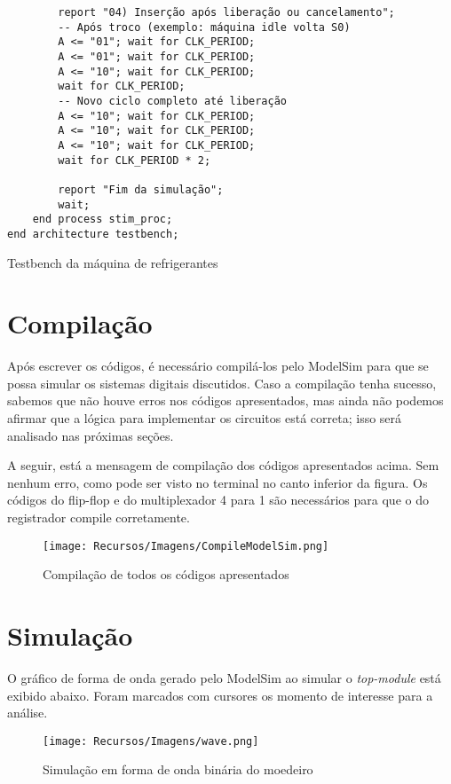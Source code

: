 \documentclass[a4paper,12pt]{article}
\newenvironment{code}{\captionsetup{type=listing}}{}
\begin{document}
\begin{code}
\begin{verbatim}
        report "04) Inserção após liberação ou cancelamento";
        -- Após troco (exemplo: máquina idle volta S0)
        A <= "01"; wait for CLK_PERIOD;
        A <= "01"; wait for CLK_PERIOD;
        A <= "10"; wait for CLK_PERIOD;
        wait for CLK_PERIOD;
        -- Novo ciclo completo até liberação
        A <= "10"; wait for CLK_PERIOD;
        A <= "10"; wait for CLK_PERIOD;
        A <= "10"; wait for CLK_PERIOD;
        wait for CLK_PERIOD * 2;

        report "Fim da simulação";
        wait;
    end process stim_proc;
end architecture testbench;
    \end{verbatim}
    \caption{Testbench da máquina de refrigerantes}
\end{code}


\section{Compilação}
Após escrever os códigos, é necessário compilá-los pelo ModelSim para que se possa simular os sistemas digitais discutidos. Caso a compilação tenha sucesso, sabemos que não houve erros nos códigos apresentados, mas ainda não podemos afirmar que a lógica para implementar os circuitos está correta; isso será analisado nas próximas seções.

A seguir, está a mensagem de compilação dos códigos apresentados acima. Sem nenhum erro, como pode ser visto no terminal no canto inferior da figura. Os códigos do flip-flop e do multiplexador 4 para 1 são necessários para que o do registrador compile corretamente.

\begin{figure}[H]
    \centering
    \texttt{[image: Recursos/Imagens/CompileModelSim.png]}
    \caption{Compilação de todos os códigos apresentados}
\end{figure}

\newpage

\section{Simulação}
O gráfico de forma de onda gerado pelo ModelSim ao simular o \textit{top-module} está exibido abaixo. Foram marcados com cursores os momento de interesse para a análise.

\begin{figure}[H]
    \centering
    \begin{tcolorbox}[colframe=cinza, colback=white, boxrule=0.75pt, arc=0pt, width=1\textwidth, center, boxsep=0pt, left=0pt, right=0pt, top=0pt, bottom=0pt]
    \texttt{[image: Recursos/Imagens/wave.png]}
    \end{tcolorbox}
    \caption{Simulação em forma de onda binária do moedeiro}
    \label{fig: ondas}
\end{figure}
\end{document}
